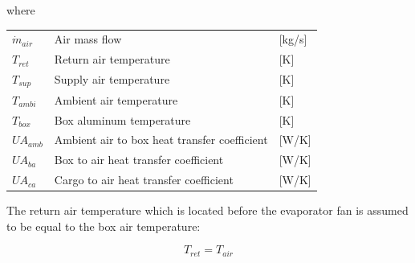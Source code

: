 where
\begin{center}
	\begin{tabular}{l p{8cm} l}
		$\dot{m}_{air}$ & Air mass flow                                & [\si{kg}/{\si{s}}] \\
		$T_{ret}$       & Return air temperature                       & [\si{K}]           \\
		$T_{sup}$       & Supply air temperature                       & [\si{K}]           \\
		$T_{ambi}$      & Ambient air temperature                      & [\si{K}]           \\
		$T_{box}$       & Box aluminum temperature                     & [\si{K}]           \\
		$U A_{amb}$     & Ambient air to box heat transfer coefficient & [\si{W}/\si{K}]    \\
		$U A_{ba}$      & Box to air heat transfer coefficient         & [\si{W}/\si{K}]    \\
		$U A_{ca}$  	& Cargo to air heat transfer coefficient       & [\si{W}/\si{K}]    \\
	\end{tabular}
\end{center}


The return air temperature which is located before the evaporator fan is assumed to be equal to the box air temperature:

\begin{equation} \label{eq:box_Tref}
	T_{ret} = T_{air}
\end{equation}



